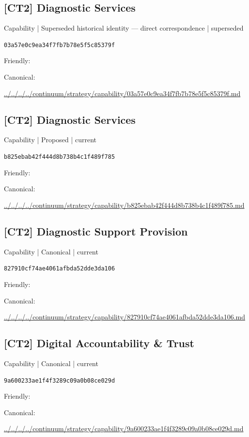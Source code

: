 \documentclass[10pt,a4paper]{article}
\begin{document}
\subsection*{[CT2] Diagnostic Services}
{\small Capability | Superseded historical identity — direct correspondence | superseded}\par
\texttt{03a57e0c9ea34f7fb7b78e5f5c85379f}\par
Friendly: \par
Canonical: \par
{\footnotesize\url{../../../../continuum/strategy/capability/03a57e0c9ea34f7fb7b78e5f5c85379f.md}}\par
\subsection*{[CT2] Diagnostic Services}
{\small Capability | Proposed | current}\par
\texttt{b825ebab42f444d8b738b4c1f489f785}\par
Friendly: \par
Canonical: \par
{\footnotesize\url{../../../../continuum/strategy/capability/b825ebab42f444d8b738b4c1f489f785.md}}\par
\subsection*{[CT2] Diagnostic Support Provision}
{\small Capability | Canonical | current}\par
\texttt{827910cf74ae4061afbda52dde3da106}\par
Friendly: \par
Canonical: \par
{\footnotesize\url{../../../../continuum/strategy/capability/827910cf74ae4061afbda52dde3da106.md}}\par
\subsection*{[CT2] Digital Accountability \& Trust}
{\small Capability | Canonical | current}\par
\texttt{9a600233ae1f4f3289c09a0b08ce029d}\par
Friendly: \par
Canonical: \par
{\footnotesize\url{../../../../continuum/strategy/capability/9a600233ae1f4f3289c09a0b08ce029d.md}}\par
\end{document}
